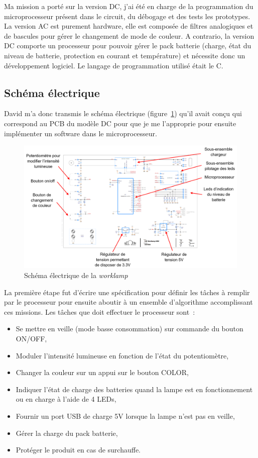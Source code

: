 \documentclass[a4paper, 12pt, sffamily]{report}
\begin{document}
Ma mission a porté sur la version DC, j’ai été en charge de la programmation du microprocesseur présent dans le circuit, du débogage et des tests les prototypes. La version AC est purement hardware, elle est composée de filtres analogiques et de bascules pour gérer le changement de mode de couleur. A contrario, la version DC comporte un processeur pour pouvoir gérer le pack batterie (charge, état du niveau de batterie, protection en courant et température) et nécessite donc un développement logiciel. Le langage de programmation utilisé était le C.

\subsection{Schéma électrique}
David m’a donc transmis le schéma électrique (figure~\ref{fig:worklamp_schema}) qu’il avait conçu qui correspond au PCB du modèle DC pour que je me l’approprie pour ensuite implémenter un software dans le microprocesseur.

\begin{figure}[h]
\centering
\includegraphics[scale=0.51]{figures/screenshots/version_A3_worklamp.png}
\caption{Schéma électrique de la \emph{worklamp}}
\label{fig:worklamp_schema}
\end{figure}

La première étape fut d’écrire une spécification pour définir les tâches à remplir par le processeur pour ensuite aboutir à un ensemble d’algorithme accomplissant ces missions.
Les tâches que doit effectuer le processeur sont~:
\begin{itemize} %
\item Se mettre en veille (mode basse consommation) sur commande du bouton ON/OFF,
\item Moduler l’intensité lumineuse en fonction de l’état du potentiomètre,
\item Changer la couleur sur un appui sur le bouton COLOR,
\item Indiquer l’état de charge des batteries quand la lampe est en fonctionnement ou en charge à l’aide de 4 LEDs,
\item Fournir un port USB de charge 5V lorsque la lampe n’est pas en veille,
\item Gérer la charge du pack batterie,
\item Protéger le produit en cas de surchauffe.
\end{itemize}
\end{document}
